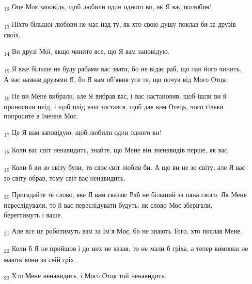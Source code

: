 \begin{tcolorbox}
\textsubscript{12} Оце Моя заповідь, щоб любили один одного ви, як Я вас полюбив!
\end{tcolorbox}
\begin{tcolorbox}
\textsubscript{13} Ніхто більшої любови не має над ту, як хто свою душу поклав би за друзів своїх.
\end{tcolorbox}
\begin{tcolorbox}
\textsubscript{14} Ви друзі Мої, якщо чините все, що Я вам заповідую.
\end{tcolorbox}
\begin{tcolorbox}
\textsubscript{15} Я вже більше не буду рабами вас звати, бо не відає раб, що пан його чинить. А вас назвав друзями Я, бо Я вам об'явив усе те, що почув від Мого Отця.
\end{tcolorbox}
\begin{tcolorbox}
\textsubscript{16} Не ви Мене вибрали, але Я вибрав вас, і вас настановив, щоб ішли ви й приносили плід, і щоб плід ваш зостався, щоб дав вам Отець, чого тільки попросите в Імення Моє.
\end{tcolorbox}
\begin{tcolorbox}
\textsubscript{17} Це Я вам заповідую, щоб любили один одного ви!
\end{tcolorbox}
\begin{tcolorbox}
\textsubscript{18} Коли вас світ ненавидить, знайте, що Мене він зненавидів перше, як вас.
\end{tcolorbox}
\begin{tcolorbox}
\textsubscript{19} Коли б ви зо світу були, то своє світ любив би. А що ви не зо світу, але Я вас зо світу обрав, тому світ вас ненавидить.
\end{tcolorbox}
\begin{tcolorbox}
\textsubscript{20} Пригадайте те слово, яке Я вам сказав: Раб не більший за пана свого. Як Мене переслідували, то й вас переслідувати будуть; як слово Моє зберігали, берегтимуть і ваше.
\end{tcolorbox}
\begin{tcolorbox}
\textsubscript{21} Але все це робитимуть вам за Ім'я Моє, бо не знають Того, хто послав Мене.
\end{tcolorbox}
\begin{tcolorbox}
\textsubscript{22} Коли б Я не прийшов і до них не казав, то не мали б гріха, а тепер вимовки не мають вони за свій гріх.
\end{tcolorbox}
\begin{tcolorbox}
\textsubscript{23} Хто Мене ненавидить, і Мого Отця той ненавидить.
\end{tcolorbox}
